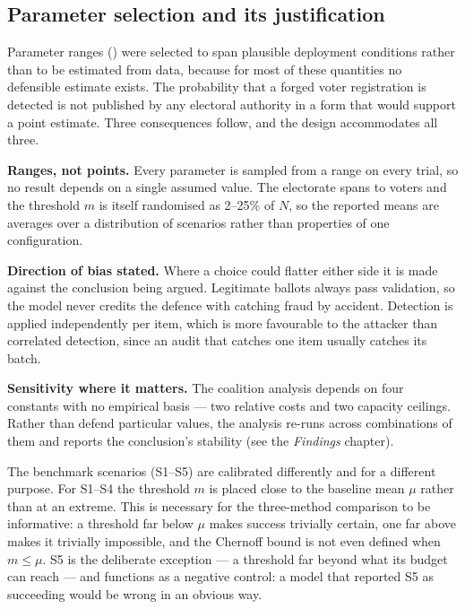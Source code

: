 \subsection{Parameter selection and its justification}
\label{sec:method-params}

Parameter ranges () were selected to span
plausible deployment conditions rather than to be estimated from data,
because for most of these quantities no defensible estimate exists. The
probability that a forged voter registration is detected is not
published by any electoral authority in a form that would support a
point estimate. Three consequences follow, and the design accommodates
all three.

\textbf{Ranges, not points.} Every parameter is sampled from a range on
every trial, so no result depends on a single assumed value. The
electorate spans \ElectorateMin{} to \ElectorateMax{} voters and the
threshold $m$ is itself randomised as 2--25\% of $N$, so the reported
means are averages over a distribution of scenarios rather than
properties of one configuration.

\textbf{Direction of bias stated.} Where a choice could flatter either
side it is made against the conclusion being argued. Legitimate ballots
always pass validation, so the model never credits the defence with
catching fraud by accident. Detection is applied independently per
item, which is more favourable to the attacker than correlated
detection, since an audit that catches one item usually catches its
batch.

\textbf{Sensitivity where it matters.} The coalition analysis depends
on four constants with no empirical basis --- two relative costs and
two capacity ceilings. Rather than defend particular values, the
analysis re-runs across \SensitivityConfigs{} combinations of them and
reports the conclusion's stability
(see the \emph{Findings} chapter).

The benchmark scenarios (S1--S5) are calibrated differently and for a
different purpose. For S1--S4 the threshold $m$ is placed close to the
baseline mean $\mu$ rather than at an extreme. This is necessary for
the three-method comparison to be informative: a threshold far below
$\mu$ makes success trivially certain, one far above makes it trivially
impossible, and the Chernoff bound is not even defined when $m \leq
\mu$. S5 is the deliberate exception --- a threshold far beyond what
its budget can reach --- and functions as a negative control: a model
that reported S5 as succeeding would be wrong in an obvious way.

